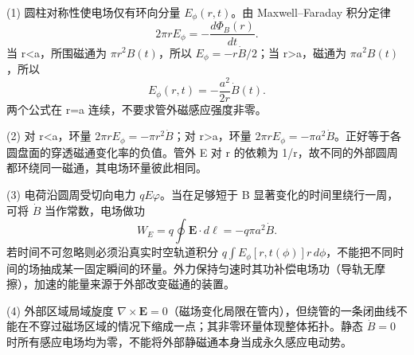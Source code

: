 (1) 圆柱对称性使电场仅有环向分量 \(E_\phi(r,t)\)。由 Maxwell–Faraday 积分定律
\[
2\pi rE_\phi=-\frac{d\Phi_B(r)}{dt}.
\]
当 r<a，所围磁通为 \(\pi r^2B(t)\)，所以 \(E_\phi=-r\dot B/2\)；当 r>a，磁通为 \(\pi a^2B(t)\)，所以
\[
E_\phi(r,t)=-\frac{a^2}{2r}\dot B(t).
\]
两个公式在 r=a 连续，不要求管外磁感应强度非零。

(2) 对 r<a，环量 \(2\pi rE_\phi=-\pi r^2\dot B\)；对 r>a，环量 \(2\pi rE_\phi=-\pi a^2\dot B\)。正好等于各圆盘面的穿透磁通变化率的负值。管外 E 对 r 的依赖为 1/r，故不同的外部圆周都环绕同一磁通，其电场环量彼此相同。

(3) 电荷沿圆周受切向电力 \(qE\varphi \)。当在足够短于 B 显著变化的时间里绕行一周，可将 \(\dot B\) 当作常数，电场做功
\[
W_E=q\oint\boldsymbol E\cdot d\boldsymbol\ell
=-q\pi a^2\dot B.
\]
若时间不可忽略则必须沿真实时空轨道积分 \(q\int E_\phi[r,t(\phi)]r\,d\phi\)，不能把不同时间的场抽成某一固定瞬间的环量。外力保持匀速时其功补偿电场功（导轨无摩擦），加速的能量来源于外部改变磁通的装置。

(4) 外部区域局域旋度 \(\nabla\times\boldsymbol E=0\)（磁场变化局限在管内），但绕管的一条闭曲线不能在不穿过磁场区域的情况下缩成一点；其非零环量体现整体拓扑。静态 \(\dot B=0\) 时所有感应电场均为零，不能将外部静磁通本身当成永久感应电动势。
